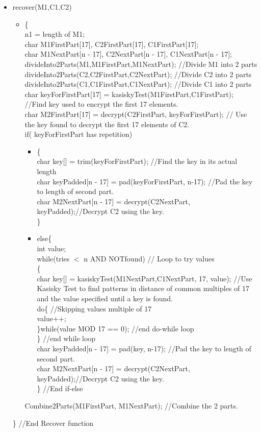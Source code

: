 \documentclass[11pt]{article}
\begin{document}
\begin{description}
\begin{itemize}
	\begin{itemize}
	\item 
	recover(M1,C1,C2)
		\begin{itemize}
		\item
		\{ \\
		n1 = length of M1; \\
		char M1FirstPart[17], C2FirstPart[17], C1FirstPart[17]; \\
		char M1NextPart[n - 17], C2NextPart[n - 17], C1NextPart[n - 17]; \\
		divideInto2Parts(M1,M1FirstPart,M1NextPart); //Divide M1 into 2 parts \\
		divideInto2Parts(C2,C2FirstPart,C2NextPart); //Divide C2 into 2 parts \\
		divideInto2Parts(C1,C1FirstPart,C1NextPart); //Divide C1 into 2 parts \\
		char keyForFirstPart[17] = kasiskyTest(M1FirstPart,C1FirstPart); //Find key used to encrypt the first 17 elements.\\
		char M2FirstPart[17] = decrypt(C2FirstPart, keyForFirstPart); // Use the key found to decrypt the first 17 elements of C2.\\
		if( keyForFirstPart has repetition)
			\begin{itemize}
			\item
			\{ \\
			char key[] = trim(keyForFirstPart); //Find the key in its actual length \\
			char keyPadded[n - 17] = pad(keyForFirstPart, n-17); //Pad the key to length of second part.\\
			char M2NextPart[n - 17] = decrypt(C2NextPart, keyPadded);//Decrypt C2 using the key. \\
		\}
			\item
			else\{ \\
			int value; \\
			while(tries $<$ n AND NOTfound)  // Loop to try values \\
				\{ \\
				char key[] = kasiskyTest(M1NextPart,C1NextPart, 17, value); //Use Kasisky Test to find patterns in distance of common multiples of 17 and the value specified until a key is found.\\
				do\{ //Skipping values multiple of 17\\
					value++; \\
				\}while(value MOD 17 == 0); //end do-while loop \\
			\} //end while loop \\
			char keyPadded[n - 17] = pad(key, n-17); //Pad the key to length of second part.\\
			char M2NextPart[n - 17] = decrypt(C2NextPart, keyPadded);//Decrypt C2 using the key. \\
		\} //End if-else
			\end{itemize}
		Combine2Parts(M1FirstPart, M1NextPart); //Combine the 2 parts.
	\end{itemize}
	\} //End Recover function\\
	\end{itemize}


\end{itemize}
\end{description}
\end{document}
